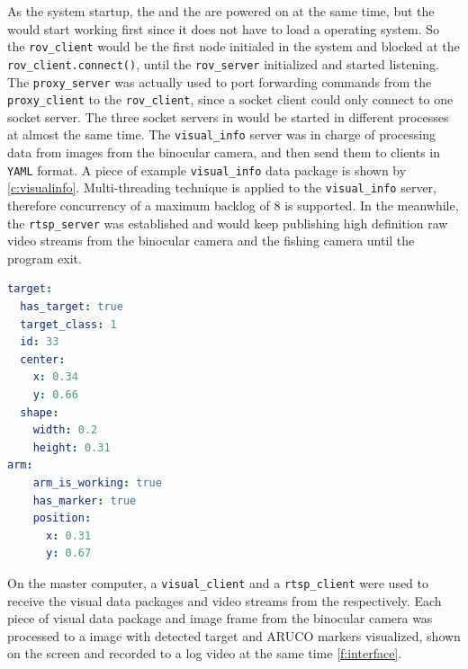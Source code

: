 As the system startup, the  and the  are
powered on at the same time, but the  would start working first
since it does not have to load a operating system. So the \texttt{rov\_client}
would be the first node initialed in the system and blocked at the
\texttt{rov\_client.connect{()}}, until the \texttt{rov\_server} initialized and
started listening. The \texttt{proxy\_server} was actually used to port
forwarding commands from the \texttt{proxy\_client} to the \texttt{rov\_client},
since a socket client could only connect to one socket server. The three socket
servers in  would be started in different processes at almost
the same time. The \texttt{visual\_info} server was in charge of processing data
from images from the binocular camera, and then send them to clients in
\texttt{YAML} format. A piece of example \texttt{visual\_info} data package is
shown by \autoref{c:visualinfo}. Multi-threading technique is applied to the
\texttt{visual\_info} server, therefore concurrency of a maximum backlog of 8 is
supported. In the meanwhile, the \texttt{rtsp\_server} was established and would
keep publishing high definition raw video streams from the binocular camera and
the fishing camera until the program exit.

{
    \singlespacing{}
    \begin{lstlisting}[language=yaml, frame=shadowbox, caption=example visual info package, label=c:visualinfo]
target:
  has_target: true
  target_class: 1
  id: 33
  center:
    x: 0.34
    y: 0.66
  shape:
    width: 0.2
    height: 0.31
arm:
    arm_is_working: true
    has_marker: true
    position:
      x: 0.31
      y: 0.67
    \end{lstlisting}
}

On the master computer, a \texttt{visual\_client} and a \texttt{rtsp\_client}
were used to receive the visual data packages and video streams from the
 respectively. Each piece of visual data package and image
frame from the binocular camera was processed to a image with detected target
and ARUCO markers visualized, shown on the screen and recorded to a log video at
the same time \autoref{f:interface}.


